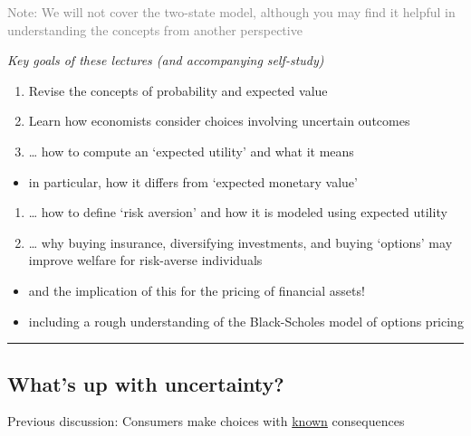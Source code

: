 \documentclass[]{article}
\providecommand{\tightlist}{%
  \setlength{\itemsep}{0pt}\setlength{\parskip}{0pt}}
\begin{document}
\textcolor{gray}{Note: We will not cover the two-state model, although you may find it helpful in understanding the concepts from another perspective}

\emph{Key goals of these lectures (and accompanying self-study)}

\begin{enumerate}
\def\labelenumi{\arabic{enumi}.}
\tightlist
\item
  Revise the concepts of probability and expected value
\item
  Learn how economists consider choices involving uncertain outcomes
\item
  \ldots{} how to compute an `expected utility' and what it means
\end{enumerate}

\begin{itemize}
\tightlist
\item
  in particular, how it differs from `expected monetary value'
\end{itemize}

\begin{enumerate}
\def\labelenumi{\arabic{enumi}.}
\tightlist
\item
  \ldots{} how to define `risk aversion' and how it is modeled using
  expected utility
\item
  \ldots{} why buying insurance, diversifying investments, and buying
  `options' may improve welfare for risk-averse individuals
\end{enumerate}

\begin{itemize}
\item
  and the implication of this for the pricing of financial assets!
\item
  including a rough understanding of the Black-Scholes model of options
  pricing
\end{itemize}

\begin{center}\rule{0.5\linewidth}{\linethickness}\end{center}

\hypertarget{whats-up-with-uncertainty}{%
\subsection{What's up with
uncertainty?}\label{whats-up-with-uncertainty}}

Previous discussion: Consumers make choices with \underline{known}
consequences
\end{document}
